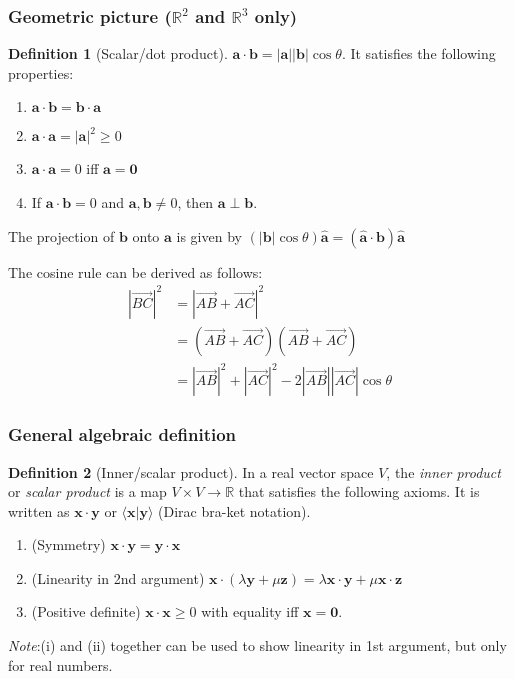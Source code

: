 \documentclass[a4paper]{article}
\theoremstyle{definition}
\newtheorem*{defi}{Definition}
\newcommand{\mb}[1]{\mathbf{#1}}
\newcommand{\note}{\noindent \emph{Note}:\;}
\newcommand{\bra}{\langle}
\newcommand{\ket}{\rangle}
\newcommand{\R}{\mathbb{R}}
\begin{document}
\subsubsection{Geometric picture (\texorpdfstring{$\R^2$}{R2} and \texorpdfstring{$\R^3$}{R3} only)}
\begin{defi}[Scalar/dot product]
  $\mb{a}\cdot\mb{b} = \mb{|a||b|}\cos\theta$. It satisfies the following properties:
  \begin{enumerate}
  \item $\mb{a\cdot b = b\cdot a}$
  \item $\mb{a\cdot a = |a|}^2 \geq 0$
  \item $\mb{a\cdot a} = 0$ iff $\mb{a = 0}$
  \item If $\mb{a\cdot b} = 0$ and $\mb{a, b}\not= 0$, then $\mb{a \perp b}$.
  \end{enumerate}
\end{defi}

The projection of $\mb{b}$ onto $\mb{a}$ is given by $(|\mb{b}|\cos\theta)\hat{\mb{a}} = \mb{(\hat{a}\cdot b)\hat{a}}$

The cosine rule can be derived as follows:
\begin{align*}
  |\overrightarrow{BC}|^2 &= |\overrightarrow{AB} + \overrightarrow{AC}|^2\\
  &= (\overrightarrow{AB} + \overrightarrow{AC})(\overrightarrow{AB} + \overrightarrow{AC})\\
  &= |\overrightarrow{AB}|^2 + |\overrightarrow{AC}|^2 - 2|\overrightarrow{AB}||\overrightarrow{AC}|\cos\theta
\end{align*}

\subsubsection{General algebraic definition}
\begin{defi}[Inner/scalar product]
  In a real vector space $V$, the \emph{inner product} or \emph{scalar product} is a map $V\times V\to \R$ that satisfies the following axioms. It is written as $\mb{x\cdot y}$ or $\bra\mb{x|y}\ket$ (Dirac bra-ket notation).
  \begin{enumerate}
  \item (Symmetry) $\mb{x\cdot y = y\cdot x}$
  \item (Linearity in 2nd argument) $\mb{x}\cdot (\lambda\mb{y} + \mu\mb{z}) = \lambda\mb{x\cdot y} + \mu\mb{x\cdot z}$
  \item (Positive definite) $\mb{x\cdot x}\geq 0$ with equality iff $\mb{x = 0}$.
  \end{enumerate}
\end{defi}
\note (i) and (ii) together can be used to show linearity in 1st argument, but only for real numbers.
\end{document}

